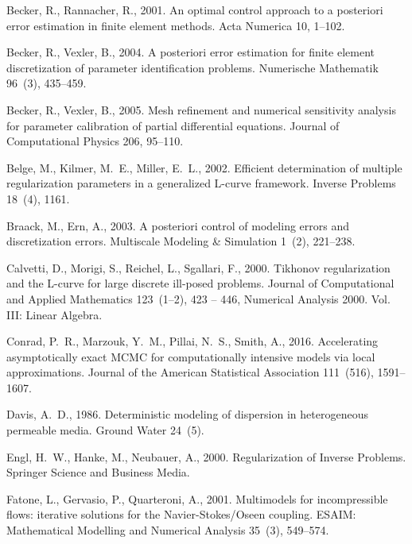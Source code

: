 \documentclass[review,sort&compress]{elsarticle}
\begin{document}
\begin{thebibliography}{42}
Becker, R., Rannacher, R., 2001. An optimal control approach to a posteriori
  error estimation in finite element methods. Acta Numerica 10, 1--102.

Becker, R., Vexler, B., 2004. A posteriori error estimation for finite element
  discretization of parameter identification problems. Numerische Mathematik
  96~(3), 435--459.

Becker, R., Vexler, B., 2005. Mesh refinement and numerical sensitivity
  analysis for parameter calibration of partial differential equations. Journal
  of Computational Physics 206, 95--110.

Belge, M., Kilmer, M.~E., Miller, E.~L., 2002. Efficient determination of
  multiple regularization parameters in a generalized {L}-curve framework.
  Inverse Problems 18~(4), 1161.

Braack, M., Ern, A., 2003. A posteriori control of modeling errors and
  discretization errors. Multiscale Modeling \& Simulation 1~(2), 221--238.

Calvetti, D., Morigi, S., Reichel, L., Sgallari, F., 2000. Tikhonov
  regularization and the {L}-curve for large discrete ill-posed problems.
  Journal of Computational and Applied Mathematics 123~(1–2), 423 -- 446,
  {N}umerical Analysis 2000. Vol. III: Linear Algebra.

Conrad, P.~R., Marzouk, Y.~M., Pillai, N.~S., Smith, A., 2016. Accelerating
  asymptotically exact {MCMC} for computationally intensive models via local
  approximations. Journal of the American Statistical Association 111~(516),
  1591--1607.

Davis, A.~D., 1986. Deterministic modeling of dispersion in heterogeneous
  permeable media. Ground Water 24~(5).

Engl, H.~W., Hanke, M., Neubauer, A., 2000. Regularization of Inverse Problems.
  Springer Science and Business Media.

Fatone, L., Gervasio, P., Quarteroni, A., 2001. Multimodels for incompressible
  flows: iterative solutions for the {N}avier-{S}tokes/{O}seen coupling. ESAIM:
  Mathematical Modelling and Numerical Analysis 35~(3), 549--574.


\end{thebibliography}
\end{document}
